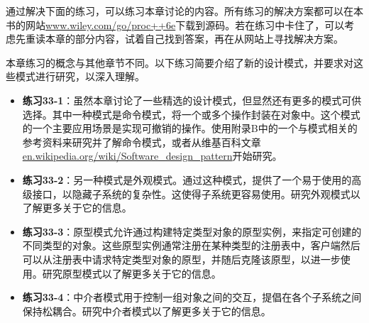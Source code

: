 通过解决下面的练习，可以练习本章讨论的内容。所有练习的解决方案都可以在本书的网站\url{www.wiley.com/go/proc++6e}下载到源码。若在练习中卡住了，可以考虑先重读本章的部分内容，试着自己找到答案，再在从网站上寻找解决方案。

本章练习的概念与其他章节不同。以下练习简要介绍了新的设计模式，并要求对这些模式进行研究，以深入理解。

\begin{itemize}
\item
\textbf{练习33-1}：虽然本章讨论了一些精选的设计模式，但显然还有更多的模式可供选择。其中一种模式是命令模式，将一个或多个操作封装在对象中。这个模式的一个主要应用场景是实现可撤销的操作。使用附录B中的一个与模式相关的参考资料来研究并了解命令模式，或者从维基百科文章\url{en.wikipedia.org/wiki/Software_design_pattern}开始研究。

\item
\textbf{练习33-2}：另一种模式是外观模式。通过这种模式，提供了一个易于使用的高级接口，以隐藏子系统的复杂性。这使得子系统更容易使用。研究外观模式以了解更多关于它的信息。

\item
\textbf{练习33-3}：原型模式允许通过构建特定类型对象的原型实例，来指定可创建的不同类型的对象。这些原型实例通常注册在某种类型的注册表中，客户端然后可以从注册表中请求特定类型对象的原型，并随后克隆该原型，以进一步使用。研究原型模式以了解更多关于它的信息。

\item
\textbf{练习33-4}：中介者模式用于控制一组对象之间的交互，提倡在各个子系统之间保持松耦合。研究中介者模式以了解更多关于它的信息。
\end{itemize}












